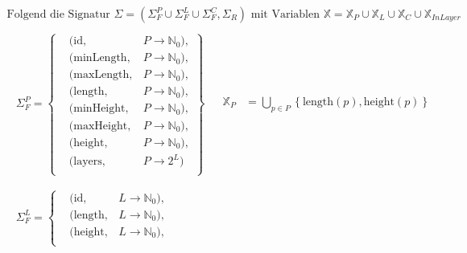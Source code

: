 \[
    \begin{aligned}
        \text{Folgend die Signatur } \Sigma = \left( \Sigma_{F}^{P} \cup \Sigma_{F}^{L} \cup \Sigma_{F}^{C}, \Sigma_{R} \right) \text{ mit Variablen } \mathbb{X} = \mathbb{X}_{P} \cup \mathbb{X}_{L} \cup \mathbb{X}_{C} \cup \mathbb{X}_{InLayer}  \\[5pt]
            \begin{array}{ll}
                \begin{aligned}
                    \Sigma_{F}^{P} = \left\{
                    \begin{aligned}
                        & (\text{id}, & P \rightarrow \mathbb{N}_0), \\
                        & (\text{minLength}, & P \rightarrow \mathbb{N}_0), \\
                        & (\text{maxLength}, & P \rightarrow \mathbb{N}_0), \\
                        & (\text{length}, & P \rightarrow \mathbb{N}_0), \\
                        & (\text{minHeight}, & P \rightarrow \mathbb{N}_0), \\
                        & (\text{maxHeight}, & P \rightarrow \mathbb{N}_0), \\
                        & (\text{height}, & P \rightarrow \mathbb{N}_0), \\
                        & (\text{layers}, & P \rightarrow 2^L)\; \\
                    \end{aligned} \right\} \\[5pt]
                \end{aligned}
                &
                \begin{aligned}
                    \mathbb{X}_{P} &= \bigcup_{p \in P} \left\{\text{length}(p), \text{height}(p) \right\} \\
                \end{aligned}
                \\
                \begin{aligned}
                    \Sigma_{F}^{L} = \left\{
                    \begin{aligned}
                        & (\text{id}, & L \rightarrow \mathbb{N}_0), \\
                        & (\text{length}, & L \rightarrow \mathbb{N}_0), \\
                        & (\text{height}, & L \rightarrow \mathbb{N}_0), \\

\end{aligned}
\end{aligned}
\end{array}
\end{aligned}\]
